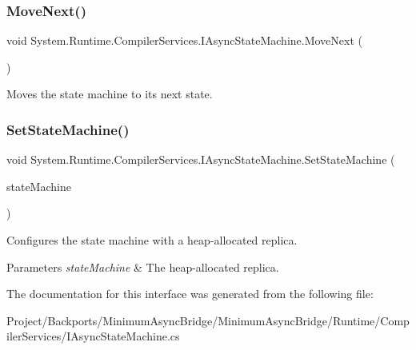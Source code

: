 \subsubsection{\texorpdfstring{Move\+Next()}{MoveNext()}}
{\footnotesize\ttfamily void System.\+Runtime.\+Compiler\+Services.\+I\+Async\+State\+Machine.\+Move\+Next (\begin{DoxyParamCaption}{ }\end{DoxyParamCaption})}



Moves the state machine to its next state.

\mbox{\label{interface_system_1_1_runtime_1_1_compiler_services_1_1_i_async_state_machine_a87166a864f9bfc0add0adae96127b8c0}} 
\subsubsection{\texorpdfstring{Set\+State\+Machine()}{SetStateMachine()}}
{\footnotesize\ttfamily void System.\+Runtime.\+Compiler\+Services.\+I\+Async\+State\+Machine.\+Set\+State\+Machine (\begin{DoxyParamCaption}\item[{\hyperlink{interface_system_1_1_runtime_1_1_compiler_services_1_1_i_async_state_machine}{I\+Async\+State\+Machine}}]{state\+Machine }\end{DoxyParamCaption})}



Configures the state machine with a heap-\/allocated replica.


\begin{DoxyParams}{Parameters}
{\em state\+Machine} & The heap-\/allocated replica.\\
\hline
\end{DoxyParams}


The documentation for this interface was generated from the following file\+:\begin{DoxyCompactItemize}
\item 
Project/\+Backports/\+Minimum\+Async\+Bridge/\+Minimum\+Async\+Bridge/\+Runtime/\+Compiler\+Services/I\+Async\+State\+Machine.\+cs\end{DoxyCompactItemize}
